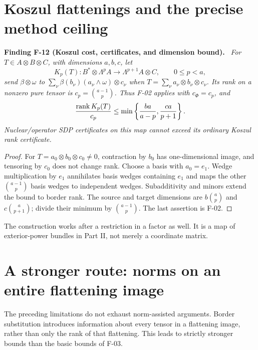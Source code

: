 \documentclass[11pt]{article}
\newenvironment{finding}[2]{\par\medskip\noindent\textbf{Finding #1 (#2).}\ \itshape}{\par\medskip}
\begin{document}
\section{Koszul flattenings and the precise method ceiling}
\begin{finding}{F-12}{Koszul cost, certificates, and dimension bound}
For $T\in A\otimes B\otimes C$, with dimensions $a,b,c$, let
\[
 K_p(T):B^*\otimes\Lambda^p A\longrightarrow
          \Lambda^{p+1}A\otimes C,\qquad 0\leq p<a,
\]
send $\beta\otimes\omega$ to
$\sum_\nu\beta(b_\nu)(a_\nu\wedge\omega)\otimes c_\nu$
when $T=\sum_\nu a_\nu\otimes b_\nu\otimes c_\nu$.
Its rank on a nonzero pure tensor is
$c_p=\binom{a-1}p$. Thus F-02 applies with $c_\Phi=c_p$, and
\[
 \frac{\operatorname{rank} K_p(T)}{c_p}
 \leq \min\left\{\frac{ba}{a-p},\frac{ca}{p+1}\right\}.
\]
Nuclear/operator SDP certificates on this map cannot exceed its
ordinary Koszul rank certificate.
\end{finding}
\begin{proof}
For $T=a_0\otimes b_0\otimes c_0\ne0$, contraction by $b_0$
has one-dimensional image, and tensoring by $c_0$ does not change rank.
Choose a basis with $a_0=e_1$. Wedge multiplication by $e_1$
annihilates basis wedges containing $e_1$ and maps the other
$\binom{a-1}p$ basis wedges to independent wedges.
Subadditivity and minors extend the bound to border rank.
The source and target dimensions are
$b\binom ap$ and $c\binom a{p+1}$; divide their minimum by
$\binom{a-1}p$. The last assertion is F-02.
\end{proof}
The construction works after a restriction in a factor as well.
It is a map of exterior-power bundles in Part II, not merely a
coordinate matrix.

\section{A stronger route: norms on an entire flattening image}
The preceding limitations do not exhaust norm-assisted arguments.
Border substitution introduces information about every tensor in a
flattening image, rather than only the rank of that flattening.
This leads to strictly stronger bounds than the basic bounds of F-03.
\end{document}
